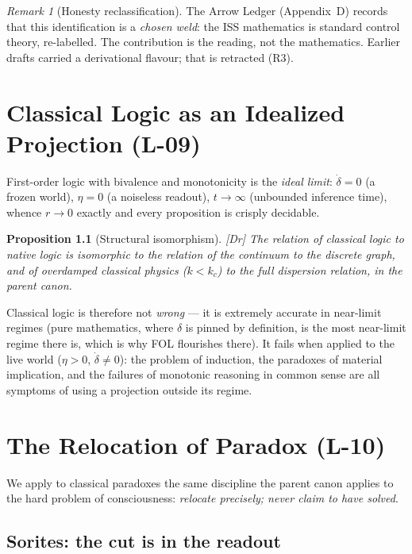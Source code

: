 \documentclass[11pt,a4paper,twoside]{book}
\newcommand{\tier}[1]{\textnormal{\small\textsf{[#1]}}}
\newcommand{\Dr}{\tier{Dr}}\newcommand{\Cj}{\tier{Cj}}\newcommand{\Wf}{\tier{Wf}}
\theoremstyle{plain}
\newtheorem{proposition}[theorem]{Proposition}
\theoremstyle{definition}
\theoremstyle{remark}
\newtheorem{remark}[theorem]{Remark}
\begin{document}
\begin{remark}[Honesty reclassification]
The Arrow Ledger (Appendix~D) records that this identification is a
\emph{chosen weld}: the ISS mathematics is standard control theory,
re-labelled. The contribution is the reading, not the mathematics. Earlier
drafts carried a derivational flavour; that is retracted (R3).
\end{remark}

\chapter{Classical Logic as an Idealized Projection (L-09)}

First-order logic with bivalence and monotonicity is the \emph{ideal limit}:
$\dot\delta=0$ (a frozen world), $\eta=0$ (a noiseless readout),
$t\to\infty$ (unbounded inference time), whence $r\to0$ exactly and every
proposition is crisply decidable.

\begin{proposition}[Structural isomorphism]\Dr
The relation of classical logic to native logic is isomorphic to the relation
of the continuum to the discrete graph, and of overdamped classical physics
($k<k_c$) to the full dispersion relation, in the parent canon.
\end{proposition}

Classical logic is therefore not \emph{wrong} --- it is extremely accurate in
near-limit regimes (pure mathematics, where $\delta$ is pinned by definition,
is the most near-limit regime there is, which is why FOL flourishes there).
It fails when applied to the live world ($\eta>0$, $\dot\delta\neq0$): the
problem of induction, the paradoxes of material implication, and the failures
of monotonic reasoning in common sense are all symptoms of using a projection
outside its regime.

\chapter{The Relocation of Paradox (L-10)}

We apply to classical paradoxes the same discipline the parent canon applies
to the hard problem of consciousness: \emph{relocate precisely; never claim to
have solved}.

\section{Sorites: the cut is in the readout}
\end{document}
